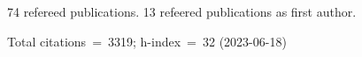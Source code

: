 74 refereed publications. 13 refeered publications as first author.

Total citations~=~3319; h-index~=~32 (2023-06-18)